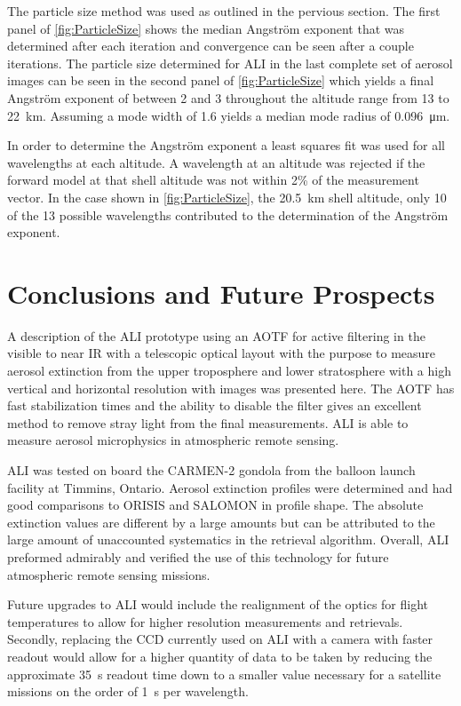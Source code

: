 \documentclass[12pt]{article}
\begin{document}
The particle size method was used as outlined in the pervious section. The first panel of \autoref{fig:ParticleSize} shows the median Angstr\"{o}m exponent that was determined 
after each iteration and convergence can be seen after a couple iterations. The particle size determined for ALI in the last complete set of aerosol images can be seen in the 
second panel of \autoref{fig:ParticleSize} which yields a final Angstr\"{o}m exponent of between 2 and 3 throughout the altitude range from 13 to 22~km. Assuming a mode width of 
1.6 yields a median mode radius of 0.096~\si{\micro\metre}.

In order to determine the Angstr\"{o}m exponent a least squares fit was used for all wavelengths at each altitude. A wavelength at an altitude was rejected if the forward model 
at that shell altitude was not within 2\% of the measurement vector. In the case shown in \autoref{fig:ParticleSize}, the 20.5~km shell altitude, only 10 of the 13 possible 
wavelengths contributed to the determination of the Angstr\"{o}m exponent.

\section{Conclusions and Future Prospects}

A description of the ALI prototype using an AOTF for active filtering in the visible to near IR with a telescopic optical layout with the purpose to measure aerosol extinction 
from the upper troposphere and lower stratosphere with a high vertical and horizontal resolution with images was presented here. The AOTF has fast stabilization times and the 
ability to disable the filter gives an excellent method to remove stray light from the final measurements. ALI is able to measure aerosol microphysics in atmospheric remote 
sensing.

ALI was tested on board the CARMEN-2 gondola from the balloon launch facility at Timmins, Ontario. Aerosol extinction profiles were determined and had good comparisons to ORISIS 
and SALOMON in profile shape. The absolute extinction values are different by a large amounts but can be attributed to the large amount of unaccounted systematics in the 
retrieval algorithm. Overall, ALI preformed admirably and verified the use of this technology for future atmospheric remote sensing missions.

Future upgrades to ALI would include the realignment of the optics for flight temperatures to allow for higher resolution measurements and retrievals. Secondly, replacing the 
CCD currently used on ALI with a camera with faster readout would allow for a higher quantity of data to be taken by reducing the approximate 35~s readout time down to a smaller 
value necessary for a satellite missions on the order of 1~s per wavelength.
\end{document}
